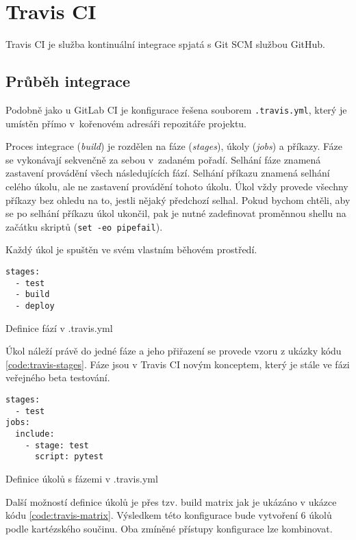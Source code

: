 \chapter{Travis CI}

Travis CI je služba kontinuální integrace spjatá s Git SCM službou GitHub.

\section{Průběh integrace}

Podobně jako u GitLab CI je konfigurace řešena souborem \verb|.travis.yml|, který je umístěn přímo v~kořenovém adresáři repozitáře projektu.

Proces integrace (\textit{build}) je rozdělen na fáze (\textit{stages}), úkoly (\textit{jobs}) a příkazy.
Fáze se vykonávají sekvenčně za sebou v~zadaném pořadí.
Selhání fáze znamená zastavení provádění všech následujících fází.
Selhání příkazu znamená selhání celého úkolu, ale ne zastavení provádění tohoto úkolu.
Úkol vždy provede všechny příkazy bez ohledu na to, jestli nějaký předchozí selhal. 
Pokud bychom chtěli, aby se po selhání příkazu úkol ukončil, pak je nutné zadefinovat proměnnou shellu na začátku skriptů (\verb|set -eo pipefail|).

Každý úkol je spuštěn ve svém vlastním běhovém prostředí.

\begin{listing}[ht]
\begin{verbatim}
stages:
  - test
  - build
  - deploy
\end{verbatim}
\caption{Definice fází v .travis.yml}
\end{listing}

Úkol náleží právě do jedné fáze a jeho přiřazení se provede vzoru z ukázky kódu \ref{code:travis-stages}.
Fáze jsou v Travis CI novým konceptem, který je stále ve fázi veřejného beta testování.

\begin{listing}[ht]
\begin{verbatim}
stages:
  - test
jobs:
  include:
    - stage: test
      script: pytest

\end{verbatim}
\label{code:travis-stages}
\caption{Definice úkolů s fázemi v .travis.yml}
\end{listing}

Další možností definice úkolů je přes tzv. build matrix jak je ukázáno v ukázce kódu \ref{code:travis-matrix}.
Výsledkem této konfigurace bude vytvoření 6 úkolů podle kartézského součinu.
Oba zmíněné přístupy konfigurace lze kombinovat.

